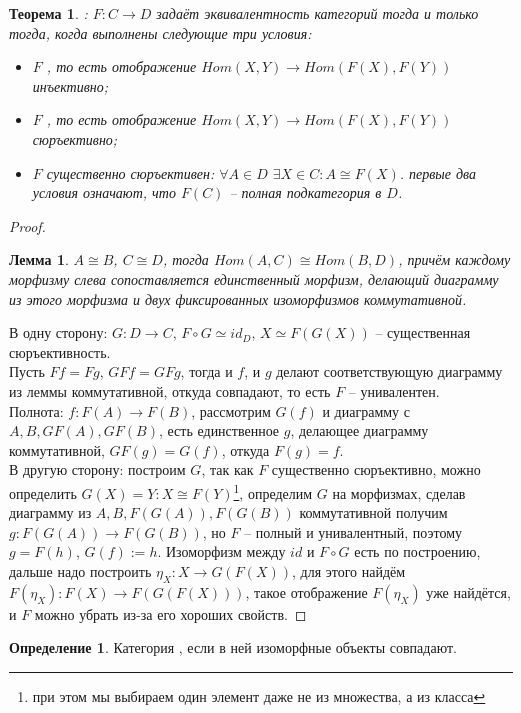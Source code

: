 \documentclass[a4paper]{article}
\theoremstyle{indented}
\newtheorem{theorem}{Теорема}
\newtheorem{lemma}{Лемма}
\theoremstyle{definition}
\newtheorem{defn}{Определение}
\theoremstyle{remark}
\begin{document}
\begin{theorem} : 
$F: C\rightarrow D$ задаёт эквивалентность категорий тогда и только тогда, когда выполнены следующие три условия:\begin{itemize}
\item $F$ , то есть отображение $Hom(X, Y) \rightarrow Hom(F(X), F(Y))$ инъективно;
\item $F$ , то есть отображение $Hom(X, Y) \rightarrow Hom(F(X), F(Y))$ сюръективно;
\item $F$ существенно сюръективен: $\forall A \in D$ $\exists X \in C: A \cong F(X)$.
\remark первые два условия означают, что $F(C)$ -- полная подкатегория в $D$.
\end{itemize}
\end{theorem}
\begin{proof}
\begin{lemma}
$A \cong B$, $C \cong D$, тогда $Hom(A, C) \cong Hom (B, D)$, причём каждому морфизму слева сопоставляется единственный морфизм, делающий  диаграмму из этого морфизма и двух фиксированных изоморфизмов коммутативной.
\end{lemma}
В одну сторону: $G: D \rightarrow C$, $F \circ G \simeq id_D$, $X \simeq F(G(X))$ -- существенная сюръективность.
\\Пусть $Ff = Fg$, $GFf = GFg$, тогда и $f$, и $g$ делают соответствующую диаграмму из леммы коммутативной, откуда совпадают, то есть $F$ -- унивалентен.
\\Полнота: $f: F(A) \rightarrow F(B)$, рассмотрим $G(f)$ и диаграмму с $A, B, GF(A), GF(B)$, есть единственное $g$, делающее диаграмму коммутативной, $GF(g) = G(f)$, откуда $F(g) = f$.
\\В другую сторону: построим $G$, так как $F$ существенно сюръективно, можно определить $G(X) = Y: X \cong F(Y)$\footnote{при этом мы выбираем один элемент даже не из множества, а из класса}, определим $G$ на морфизмах, сделав диаграмму из $A, B, F(G(A)), F(G(B))$ коммутативной получим $g: F(G(A)) \rightarrow F(G(B))$, но $F$ -- полный и унивалентный, поэтому $g = F(h)$, $G(f) := h$. Изоморфизм между $id$ и $F \circ G$ есть по построению, дальше надо построить $\eta_X: X \rightarrow G(F(X))$, для этого найдём $F(\eta_X): F(X) \rightarrow F(G(F(X)))$, такое отображение $F(\eta_X)$ уже найдётся, и $F$ можно убрать из-за его хороших свойств. 
\end{proof}
\begin{defn}
Категория , если в ней изоморфные объекты совпадают.
\end{defn}
\end{document}
